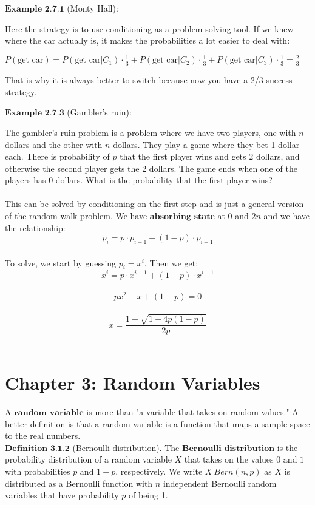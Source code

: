\documentclass{article}
\begin{document}
    $\textbf{Example 2.7.1}$ (Monty Hall):

    Here the strategy is to use conditioning as a problem-solving tool. If we knew where the car actually is, it makes the probabilities a lot easier to deal with:

    $P(\textrm{get car})=P(\textrm{get car}|C_1)\cdot\frac{1}{3}+P(\textrm{get car}|C_2)\cdot\frac{1}{3}+P(\textrm{get car}|C_3)\cdot\frac{1}{3} = \frac{2}{3}$

    That is why it is always better to switch because now you have a 2/3 success strategy.

    $\textbf{Example 2.7.3}$ (Gambler's ruin):

    The gambler's ruin problem is a problem where we have two players, one with $n$ dollars and the other with $n$ dollars. They play a game where they bet 1 dollar each. There is probability of $p$  that the first player wins and gets 2 dollars, and otherwise the second player gets the 2 dollars. The game ends when one of the players has 0 dollars. What is the probability that the first player wins?\\\\

    This can be solved by conditioning on the first step and is just a general version of the random walk problem. We have $\textbf{absorbing state}$ at $0$ and $2n$ and we have the relationship:
        $$p_i=p\cdot p_{i+1}+(1-p)\cdot p_{i-1}$$\\

    To solve, we start by guessing $p_i=x^i$. Then we get:
        $$x^i=p\cdot x^{i+1}+(1-p)\cdot x^{i-1}$$\\
        $$px^2-x+(1-p)=0$$\\
        $$x=\frac{1\pm\sqrt{1-4p(1-p)}}{2p}$$\\

    \section{Chapter 3: Random Variables}

    A $\textbf{random variable}$ is more than "a variable that takes on random values." A better definition is that a random variable is a function that maps a sample space to the real numbers.\\

    $\textbf{Definition 3.1.2}$ (Bernoulli distribution). The $\textbf{Bernoulli distribution}$ is the probability distribution of a random variable $X$ that takes on the values $0$ and $1$ with probabilities $p$ and $1-p$, respectively. We write $X ~ Bern(n,p)$ as $X$ is distributed as a Bernoulli function with $n$ independent Bernoulli random variables that have probability $p$ of being 1.\\
\end{document}
